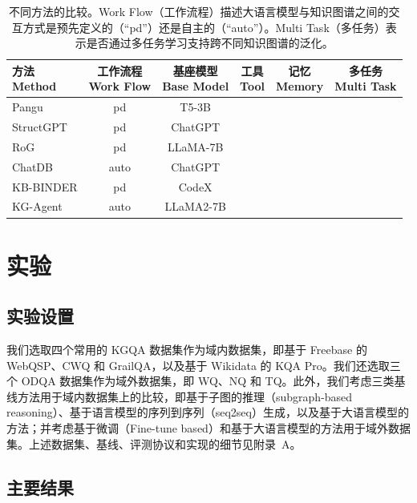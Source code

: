 \documentclass[11pt,UTF8,fontset=fandol]{ctexart}
\newcommand{\cmark}{\textcolor{green!55!black}{\ding{51}}}
\newcommand{\xmark}{\textcolor{red!75!black}{\ding{55}}}
\begin{document}
\begin{table}[H]\centering
\caption{不同方法的比较。Work Flow（工作流程）描述大语言模型与知识图谱之间的交互方式是预先定义的（``pd''）还是自主的（``auto''）。Multi Task（多任务）表示是否通过多任务学习支持跨不同知识图谱的泛化。}
\label{tab:1}
\begin{tabular}{lccccc}
\toprule
\makecell{方法\\Method} & \makecell{工作流程\\Work Flow} & \makecell{基座模型\\Base Model} & \makecell{工具\\Tool} & \makecell{记忆\\Memory} & \makecell{多任务\\Multi Task} \\
\midrule
Pangu      & pd   & T5-3B     & \xmark & \xmark & \xmark \\
StructGPT  & pd   & ChatGPT   & \cmark & \xmark & \xmark \\
RoG        & pd   & LLaMA-7B  & \xmark & \xmark & \xmark \\
ChatDB     & auto & ChatGPT   & \xmark & \cmark & \xmark \\
KB-BINDER  & pd   & CodeX     & \xmark & \xmark & \xmark \\
KG-Agent   & auto & LLaMA2-7B & \cmark & \cmark & \cmark \\
\bottomrule
\end{tabular}
\end{table}

\section{实验}

\subsection{实验设置}

我们选取四个常用的 KGQA 数据集作为域内数据集，即基于 Freebase 的 WebQSP、CWQ 和 GrailQA，以及基于 Wikidata 的 KQA Pro。我们还选取三个 ODQA 数据集作为域外数据集，即 WQ、NQ 和 TQ。此外，我们考虑三类基线方法用于域内数据集上的比较，即基于子图的推理（subgraph-based reasoning）、基于语言模型的序列到序列（seq2seq）生成，以及基于大语言模型的方法；并考虑基于微调（Fine-tune based）和基于大语言模型的方法用于域外数据集。上述数据集、基线、评测协议和实现的细节见附录~A。

\subsection{主要结果}
\end{document}

